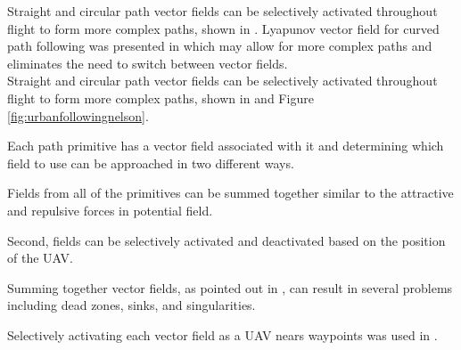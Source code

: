 \documentclass[numbered,pdftex]{ohio-etd}
\begin{document}
Straight and circular path vector fields can be selectively activated throughout flight to form more complex paths, shown in \cite{nelson_cooperative_2005,nelson_vector_2006,nelson_vector_2007,jung_unmanned_2016}. Lyapunov vector field for curved path following was presented in \cite{griffiths_vector_2006} which may allow for more complex paths and eliminates the need to switch between vector fields. \\


%
%

Straight and circular path vector fields can be selectively activated throughout flight to form more complex paths, shown in \cite{nelson_cooperative_2005,nelson_vector_2006,nelson_vector_2007,jung_unmanned_2016} and Figure \ref{fig:urbanfollowingnelson}. 

Each path primitive has a vector field associated with it and determining which field to use can be approached in two different ways. 

Fields from all of the primitives can be summed together similar to the attractive and repulsive forces in potential field. 

Second, fields can be selectively activated and deactivated based on the position of the UAV.

 Summing together vector fields, as pointed out in \cite{nelson_cooperative_2005}, can result in several problems including dead zones, sinks, and singularities. 
 
 Selectively activating each vector field as a UAV nears waypoints was used in \cite{nelson_cooperative_2005,nelson_vector_2006,nelson_vector_2007,jung_unmanned_2016}.
\end{document}
